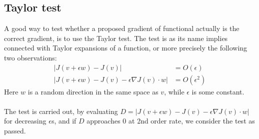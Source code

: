 \subsection{Taylor test}
A good way to test whether a proposed gradient of functional actually is the correct gradient, is to use the Taylor test. The test is as its name implies connected with Taylor expansions of a function, or more precisely the following two observations:
\begin{align*}
|J(v+\epsilon w)-J(v)| &= O(\epsilon) \\
|J(v+\epsilon w)-J(v)-\epsilon\nabla J(v)\cdot w| &= O(\epsilon^2)
\end{align*}
Here $w$ is a random direction in the same space as $v$, while $\epsilon$ is some constant. 
\\
\\
The test is carried out, by evaluating $D=|J(v+\epsilon w)-J(v)-\epsilon\nabla J(v)\cdot w|$ for decreasing $\epsilon$s, and if $D$ approaches 0 at 2nd order rate, we consider the test as passed.
